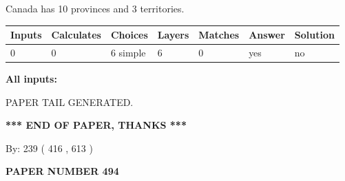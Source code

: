 \documentclass[12pt]{article}
\begin{document}
 
\noindent{}
 
 
Canada has 10  provinces and 3 territories.
 
 
\noindent{}
 
 
   
   
   
   
\noindent\begin{tabular}{|l|l|l|l|l|l|l|}
 \hline
Inputs & Calculates & Choices & Layers & Matches & Answer & Solution \\ \hline
 0  & 
 0  & 
 6
  simple  
  & 
 6  & 
 0  & 
  yes & 
  no 
  \\ \hline
 \end{tabular}
   
   
   
   
\noindent{}
   
   
   
   
\noindent\vspace{0.1in}\hspace{-0.08in} {\textbf{\Large{All inputs: }}}
   
   
   
   
   
   
 \vspace{0.2in}
 
   
   
\vspace{2.0in} PAPER TAIL GENERATED.
   
   
   
   
\vspace{1.0in} 
{\textbf{\large{ *** END OF PAPER, THANKS *** }}} 
   
   
\hspace{1.0in} By: 
 239 ( 416 ,  613 )
   
   
   
   
\newpage 
\setcounter{page}{ 
   494001 } 
   
   
   
   
 {\textbf{ \Large{ PAPER NUMBER  494  }}}
   
   
\vspace{0.2in}
   
   
   
\end{document}
